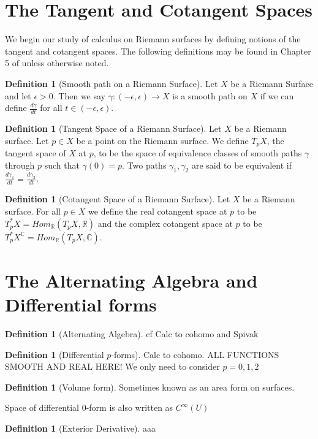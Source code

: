 \documentclass[11pt]{report}
\theoremstyle{definition}
\newtheorem{defn}[thm]{Definition}
\begin{document}
\section{The Tangent and Cotangent Spaces}
We begin our study of calculus on Riemann surfaces by defining notions of
the tangent and cotangent spaces. The following definitions may be found
in Chapter 5 of \cite{donaldson} unless otherwise noted.

\begin{defn}[Smooth path on a Riemann Surface]\label{Smooth Path}
  Let $X$ be a Riemann Surface and let $\epsilon > 0$. Then we say
  $\gamma:(-\epsilon,\epsilon) \rightarrow X$ is a smooth path on $X$ if
  we can define $\frac{d\gamma}{dt}$ for all $t \in (-\epsilon,\epsilon)$.
\end{defn}

\begin{defn}[Tangent Space of a Riemann Surface]\label{TpX}
  Let $X$ be a Riemann surface. Let $p \in X$ be a point on the Riemann
  surface. We define $T_pX$, the tangent space of $X$ at
  $p$, to be the
  space of equivalence classes of smooth paths $\gamma$ through $p$ such
  that $\gamma(0)=p$. Two paths $\gamma_1, \gamma_2$ are said to be
  equivalent if $\frac{d\gamma_1}{dt}=\frac{d\gamma_2}{dt}$.
\end{defn}

\begin{defn}[Cotangent Space of a Riemann Surface]\label{T*pX}
  Let $X$ be a Riemann surface. For all $p \in X$ we define the real
  cotangent space at $p$ to be
  $T^*_pX = Hom_{\mathbb{R}}(T_pX, \mathbb{R})$ and the complex cotangent
  space at $p$ to be
  $T^*_pX^{\mathbb{C}} = Hom_{\mathbb{R}}(T_pX,\mathbb{C})$.
\end{defn}

\section{The Alternating Algebra and Differential forms}

\begin{defn}[Alternating Algebra]\label{AltAlg}
  cf Calc to cohomo and Spivak  
\end{defn}

\begin{defn}[Differential $p$-forms]\label{p-form}
  Calc to cohomo. ALL FUNCTIONS SMOOTH AND REAL HERE! We only need to consider $p=0,1,2$
\end{defn}

\begin{defn}[Volume form]\label{volumeform}
  Sometimes known as an area form on surfaces.
\end{defn}
  Space of differential $0$-form is also written as $C^{\infty}(U)$
\begin{defn}[Exterior Derivative]\label{exteriorD}
  aaa
\end{defn}
\end{document}
